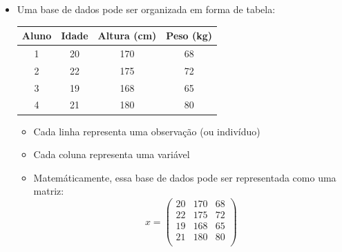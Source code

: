 \documentclass[12pt]{article}
\begin{document}
\begin{itemize}
        \item Uma base de dados pode ser organizada em forma de tabela:
        \begin{table}[H]
            \centering
            \begin{tabular}{c|c|c|c}
                Aluno & Idade & Altura (cm) & Peso (kg) \\ \hline
                1 & 20 & 170 & 68 \\
                2 & 22 & 175 & 72 \\
                3 & 19 & 168 & 65 \\
                4 & 21 & 180 & 80 \\ \hline
            \end{tabular}    
        \end{table}
        \begin{itemize}
            \item Cada linha representa uma observação (ou indivíduo)
            \item Cada coluna representa uma variável
            \item Matemáticamente, essa base de dados pode ser representada 
            como uma matriz:
            \[ x = 
            \begin{pmatrix}
                20 & 170 & 68 \\
                22 & 175 & 72 \\
                19 & 168 & 65 \\
                21 & 180 & 80 \\
            \end{pmatrix}
            \]
        \end{itemize}
    \end{itemize}
\end{document}
